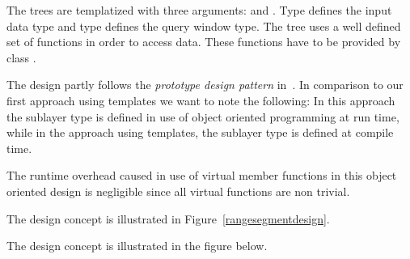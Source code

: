 The trees are templatized with three arguments:  
and . Type  defines
the input data type and type  defines the query
window type.  The tree uses a well defined set of functions in
order to access data. These functions have to be provided by
class . 


The design partly follows  the {\em prototype design pattern}
in~\cite{designpatterns}. In comparison to our first approach
using templates we want to note the following: In this approach
the sublayer type is defined in
use of object oriented programming at run time, while in the
approach using templates, the sublayer type is defined at compile
time. 

The runtime overhead caused in use of virtual member
functions in this object oriented design is negligible since all virtual
functions are non trivial.
\begin{ccTexOnly}
The design concept is illustrated in Figure~\ref{rangesegmentdesign}.
\end{ccTexOnly}
\begin{ccHtmlOnly}
The design concept is illustrated in the figure below.
\end{ccHtmlOnly}

